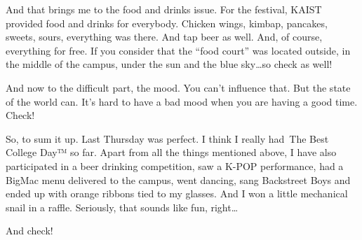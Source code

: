 \begin{post}
\begin{content}
And that brings me to the food and drinks issue. For the festival, KAIST provided food and drinks for everybody. Chicken wings, kimbap, pancakes, sweets, sours, everything was there. And tap beer as well. And, of course, everything for free. If you consider that the ``food court'' was located outside, in the middle of the campus, under the sun and the blue sky{\ldots}so \textcolor{Chameleon}{check} as well!

And now to the difficult part, the mood. You can't influence that. But the state of the world can. It's hard to have a bad mood when you are having a good time. \textcolor{Chameleon}{Check!}

So, to sum it up. Last Thursday was perfect. I think I really had The Best College Day™ so far. Apart from all the things mentioned above, I have also participated in a beer drinking competition, saw a K-POP performance, had a BigMac menu delivered to the campus, went dancing, sang Backstreet Boys and ended up with orange ribbons tied to my glasses. And I won a little mechanical snail in a raffle. Seriously, that sounds like fun, right\ldots

And \textcolor{Chameleon}{check}!
	\end{content}
\end{post}
